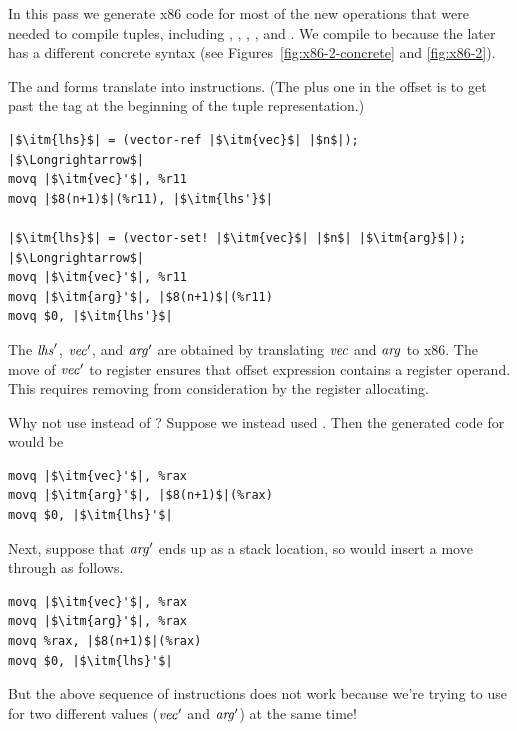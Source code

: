 \documentclass[11pt]{book}
\begin{document}

In this pass we generate x86 code for most of the new operations that
were needed to compile tuples, including ,
, , , and
. We compile  to  because
the later has a different concrete syntax (see
Figures~\ref{fig:x86-2-concrete} and \ref{fig:x86-2}).

The  and  forms translate into
 instructions.  (The plus one in the offset is to get past
the tag at the beginning of the tuple representation.)
\begin{lstlisting}
|$\itm{lhs}$| = (vector-ref |$\itm{vec}$| |$n$|);
|$\Longrightarrow$|
movq |$\itm{vec}'$|, %r11
movq |$8(n+1)$|(%r11), |$\itm{lhs'}$|

|$\itm{lhs}$| = (vector-set! |$\itm{vec}$| |$n$| |$\itm{arg}$|);
|$\Longrightarrow$|
movq |$\itm{vec}'$|, %r11
movq |$\itm{arg}'$|, |$8(n+1)$|(%r11)
movq $0, |$\itm{lhs'}$|
\end{lstlisting}
The $\mathit{lhs}'$, $\mathit{vec}'$, and $\mathit{arg}'$ are obtained by
translating $\mathit{vec}$ and $\mathit{arg}$ to x86.  The move of $\mathit{vec}'$ to
register  ensures that offset expression
 contains a register operand.  This requires
removing  from consideration by the register allocating.

Why not use  instead of ? Suppose we instead used
. Then the generated code for  would be
\begin{lstlisting}
movq |$\itm{vec}'$|, %rax
movq |$\itm{arg}'$|, |$8(n+1)$|(%rax)
movq $0, |$\itm{lhs}'$|
\end{lstlisting}
Next, suppose that $\mathit{arg}'$ ends up as a stack location, so
 would insert a move through 
as follows.
\begin{lstlisting}
movq |$\itm{vec}'$|, %rax
movq |$\itm{arg}'$|, %rax
movq %rax, |$8(n+1)$|(%rax)
movq $0, |$\itm{lhs}'$|
\end{lstlisting}
But the above sequence of instructions does not work because we're
trying to use  for two different values ($\mathit{vec}'$ and
$\mathit{arg}'$) at the same time!
\end{document}
